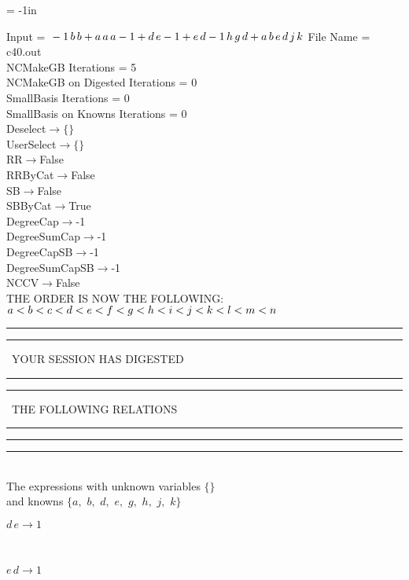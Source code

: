 \voffset = -1in
\evensidemargin 0.1in
\oddsidemargin 0.1in
\textheight 9in
\textwidth 6in

\normalsize
\baselineskip=12pt
\noindent
Input = 
$
\\-1\,
 b\,
 b + a\,
 a\,
 a\\
-1 + d\,
 e\\
-1 + e\,
 d\\
-1\,
 h\,
 g\,
 d + a\,
 b\,
 e\,
 d\,
 j\,
 k\\
$
File Name = c40.out\\
NCMakeGB Iterations = 5\\
NCMakeGB on Digested Iterations = 0\\
SmallBasis Iterations = 0\\
SmallBasis on Knowns Iterations = 0\\
Deselect$\rightarrow \{\}$\\
UserSelect$\rightarrow \{\}$\\
RR$\rightarrow $False\\
RRByCat$\rightarrow $False\\
SB$\rightarrow $False\\
SBByCat$\rightarrow $True\\
DegreeCap$\rightarrow $-1\\
DegreeSumCap$\rightarrow $-1\\
DegreeCapSB$\rightarrow $-1\\
DegreeSumCapSB$\rightarrow $-1\\
NCCV$\rightarrow $False\\
THE ORDER IS NOW THE FOLLOWING:\hfil\break
$
a<b<c<d<e<f<g<h<i<j<k<l<m<n\\
$
\rule[2pt]{6in}{4pt}\hfil\break
\rule[2pt]{1.879in}{4pt}
\ YOUR SESSION HAS DIGESTED\ 
\rule[2pt]{1.879in}{4pt}\hfil\break
\rule[2pt]{1.923in}{4pt}
\ THE FOLLOWING RELATIONS\ 
\rule[2pt]{1.923in}{4pt}\hfil\break
\rule[2pt]{6in}{4pt}\hfil\break
\rule[3pt]{6in}{.7pt}\\
The expressions with unknown variables $\{\}$\\
and knowns $\{a,
$ $
b,
$ $
d,
$ $
e,
$ $
g,
$ $
h,
$ $
j,
$ $
k\}$\smallskip\\
\begin{minipage}{6in}
$
d\,
 e\rightarrow 1
$
\end{minipage}\medskip \\
\begin{minipage}{6in}
$
e\,
 d\rightarrow 1
$
\end{minipage}\medskip \\
